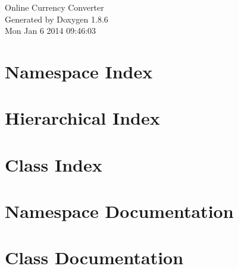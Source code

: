 \documentclass[twoside]{book}
\newcommand{\clearemptydoublepage}{%
  \newpage{\pagestyle{empty}\cleardoublepage}%
}
\begin{document}
\hypersetup{pageanchor=false}
\begin{titlepage}
\vspace*{7cm}
\begin{center}%
{\Large Online Currency Converter }\\
\vspace*{1cm}
{\large Generated by Doxygen 1.8.6}\\
\vspace*{0.5cm}
{\small Mon Jan 6 2014 09:46:03}\\
\end{center}
\end{titlepage}
\clearemptydoublepage
\tableofcontents
\clearemptydoublepage
{}
\hypersetup{pageanchor=true}

\chapter{Namespace Index}

\chapter{Hierarchical Index}

\chapter{Class Index}

\chapter{Namespace Documentation}







\chapter{Class Documentation}
















\newpage
{}
{}
\printindex
\end{document}
